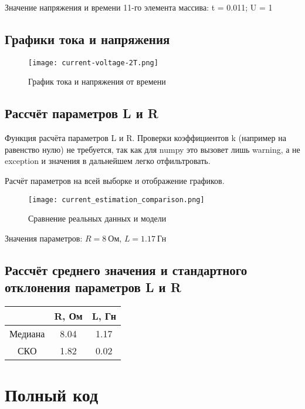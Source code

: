 \documentclass[14pt]{extarticle}
\begin{document}
    Значение напряжения и времени 11-го элемента массива: t = 0.011; U = 1

    \subsection{Графики тока и напряжения}

    \begin{figure}[H]
        \centering
        \texttt{[image: current-voltage-2T.png]}
        \caption{График тока и напряжения от времени}
    \end{figure}

    \subsection{Рассчёт параметров L и R}
    Функция расчёта параметров L и R. Проверки коэффициентов k (например на равенство нулю) не требуется,
    так как для numpy это вызовет лишь warning, а не exception и значения в дальнейшем легко отфильтровать.

    Расчёт параметров на всей выборке и отображение графиков.

    \begin{figure}[H]
        \centering
        \texttt{[image: current\_estimation\_comparison.png]}
        \caption{Сравнение реальных данных и модели}
    \end{figure}

    Значения параметров: $R = 8\ \text{Ом}$, $L = 1.17\ \text{Гн} $

    \subsection{Рассчёт среднего значения и стандартного отклонения параметров L и R}

    \begin{table}[H]
        \centering
        \begin{tabular}{|c|c|c|}
            \hline
            & R, Ом & L, Гн \\ \hline
            Медиана & 8.04  & 1.17  \\ \hline
            СКО     & 1.82  & 0.02  \\ \hline
        \end{tabular}
    \end{table}

    \pagebreak
    \section*{Полный код}
\end{document}

